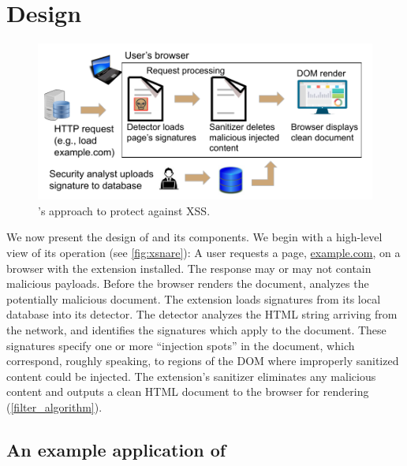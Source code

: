 \section{\sys Design} \label{xsnare_design}

 \begin{figure}[h]
	\includegraphics[scale=0.55]{img/xsnare.pdf}
	\caption{\sys's approach to protect against XSS.}
	\label{fig:xsnare}
\end{figure}

We now present the design of \sys and its components. %
%
%
We begin with a high-level view of its operation (see
\autoref{fig:xsnare}): A user requests a page, \url{example.com}, on a
browser with the \sys extension installed.
%
The response may or may not contain
malicious \xss payloads.
%
Before the browser renders the document, \sys analyzes
the potentially malicious document. The extension loads signatures
from its local database into its detector. The detector analyzes the
HTML string arriving from the network, and identifies the signatures
which apply to the document. These signatures specify one or more
``injection spots'' in the document, which correspond, roughly
speaking, to regions of the DOM where improperly sanitized content
could be injected.  The extension's sanitizer
eliminates any malicious content and outputs a clean HTML document to
the browser for rendering (\autoref{filter_algorithm}).


\subsection{An example application of \sys} \label{motivating_example}


